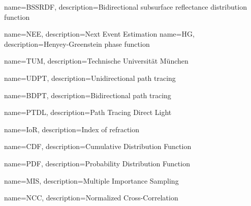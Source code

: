 {
    name={BSSRDF},
    description={Bidirectional subsurface reflectance distribution function}
}

{
    name={NEE},
    description={Next Event Estimation}
}
{
    name={HG},
    description={Henyey-Greenstein phase function}
}

{
    name={TUM},
    description={Technische Universität München}
}

{
    name={UDPT},
    description={Unidirectional path tracing}
}

{
    name={BDPT},
    description={Bidirectional path tracing}
}

{
    name={PTDL},
    description={Path Tracing Direct Light}
}

{
    name={IoR},
    description={Index of refraction}
}

{
    name={CDF},
    description={Cumulative Distribution Function}
}

{
    name={PDF},
    description={Probability Distribution Function}
}

{
    name={MIS},
    description={Multiple Importance Sampling}
}

{
    name={NCC},
    description={Normalized Cross-Correlation}
}
